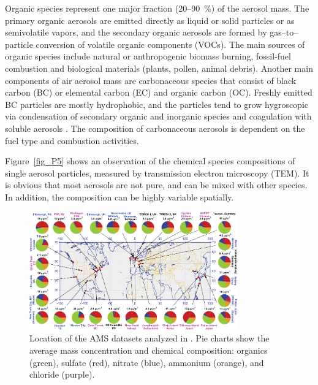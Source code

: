 \documentclass[12pt, fullpage]{uiucthesis2009_2}
\begin{document}
	Organic species represent one major fraction (20--90~$\%$) of the aerosol mass. The primary organic aerosols are emitted directly as liquid or solid particles or as semivolatile vapors, and the secondary organic aerosols are formed by gas--to--particle conversion of volatile organic components (VOCs). The main sources of organic species include natural or anthropogenic biomass burning, fossil-fuel combustion and biological materials (plants, pollen, animal debris)\citep{poschl2005}. Another main components of air aerosol mass are carbonaceous species that consist of black carbon (BC) or elemental carbon (EC) and organic carbon (OC). Freshly emitted BC particles are mostly hydrophobic, and the particles tend to grow hygroscopic via condensation of secondary organic and inorganic species and coagulation with soluble aerosols \citep{riemer2010estimating}. The composition of carbonaceous aerosols is dependent on the fuel type and combustion activities.
	
	Figure~\ref{fig_P5} shows an observation of the chemical species compositions of single aerosol particles, measured by transmission electron microscopy (TEM). It is obvious that most aerosols are not pure, and can be mixed with other species. In addition, the composition can be highly variable spatially. 
	\begin{figure}[h] 
		\begin{center}
			\includegraphics[width = 0.8\textwidth]{Figure27}
			\caption[Location of the AMS datasets analyzed in \citet{Zhang2015}. Pie charts show the average mass concentration and chemical composition: organics (green), sulfate (red), nitrate (blue), ammonium (orange), and chloride (purple)]{\label{fig_P27} Location of the AMS datasets analyzed in \citet{Zhang2015}. Pie charts show the average mass concentration and chemical composition: organics (green), sulfate (red), nitrate (blue), ammonium (orange), and chloride (purple).}
		\end{center}
	\end{figure}
	
\end{document}
